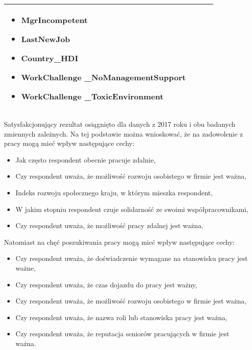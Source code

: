 \begin{minipage}{\textwidth}
\begin{table}[H]
\begin{center}
\begin{tabular}{|P{.1\textwidth}|P{.26\textwidth}|P{.26\textwidth}|P{.26\textwidth}|}
\begin{itemize}
                             \item MgrIncompetent
                             \item LastNewJob
                             \item Country\_HDI
                             \item WorkChallenge \_NoManagementSupport
                             \item WorkChallenge \_ToxicEnvironment
                         \end{itemize} \\
                         \hline
                     \end{tabular}
                 \end{center}
                 \raggedright\source{\ownwork}
                 \vspace{0.75cm}
             \end{table}
\end{minipage}

Satysfakcjonujący rezultat osiągnięto dla danych z 2017 roku i obu badanych zmiennych zależnych.
Na tej podstawie można wnioskować, że na zadowolenie z pracy mogą mieć wpływ następujące cechy:

\begin{itemize}
    \item Jak często respondent obecnie pracuje zdalnie,
    \item Czy respondent uważa, że możliwość rozwoju osobistego w firmie jest ważna,
    \item Indeks rozwoju społecznego kraju, w którym mieszka respondent,
    \item W jakim stopniu respondent czuje solidarność ze swoimi współpracownikami,
    \item Czy respondent uważa, że możliwość pracy zdalnej jest ważna.
\end{itemize}

Natomiast na chęć poszukiwania pracy mogą mieć wpływ następujące cechy:

\begin{itemize}
    \item Czy respondent uważa, że doświadczenie wymagane na stanowisku pracy jest ważne,
    \item Czy respondent uważa, że czas dojazdu do pracy jest ważny,
    \item Czy respondent uważa, że możliwość rozwoju osobistego w firmie jest ważna,
    \item Czy respondent uważa, że nazwa roli lub stanowiska pracy jest ważna,
    \item Czy respondent uważa, że reputacja seniorów pracujących w firmie jest ważna.
\end{itemize}


